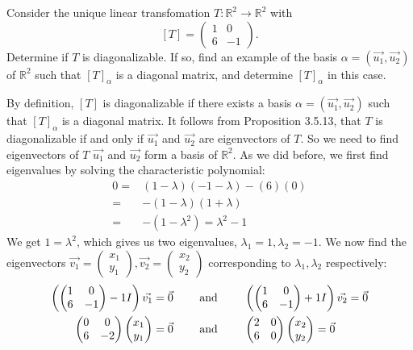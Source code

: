 \documentclass[12pt]{article}
\newenvironment{problem}[2][Problem]
{
	\begin{trivlist} 
		\item[\hskip \labelsep {\bfseries #1 #2:}]
	}
{
	\end{trivlist}
	}
\newenvironment{solution}[1][Solution]
{
	\begin{trivlist} 
		\item[\hskip \labelsep {\itshape #1:}]
	}
	{
	\end{trivlist}
}
\begin{document}
\newpage
\begin{problem}{5}
Consider the unique linear transfomation $T: \mathbb{R}^2 \to \mathbb{R}^2$ with
\[
[T] = \begin{pmatrix} 1&0\\6&-1\end{pmatrix} \text{.}
\]
Determine if $T$ is diagonalizable. If so, find an example of the basis $\alpha = (\vec{u_{1}}, \vec{u_{2}})$ of $\mathbb{R}^2$ such that $[T]_{\alpha}$ is a diagonal matrix, and determine $[T]_{\alpha}$ in this case.
\noindent
\newline
\newline
\begin{solution}
By definition, $[T]$ is diagonalizable if there exists a basis $\alpha = (\vec{u_{1}},\vec{u_{2}})$ such that $[T]_{\alpha}$ is a diagonal matrix. It follows from Proposition 3.5.13, that $T$ is diagonalizable if and only if $\vec{u_{1}}$ and $\vec{u_{2}}$ are eigenvectors of $T$. So we need to find eigenvectors of $T$ $\vec{u_{1}}$ and $\vec{u_{2}}$ form a basis of $\mathbb{R}^2$. As we did before, we first find eigenvalues by solving the characteristic polynomial:
\begin{align*}
0=&(1-\lambda)(-1-\lambda)-(6)(0)\\
=&-(1-\lambda)(1+\lambda)\\
=&-(1-\lambda ^2) = \lambda ^2 -1
\end{align*}
We get $1=\lambda ^2$, which gives us two eigenvalues, $\lambda_{1}=1,\lambda_{2}=-1$. We now find the eigenvectors $\vec{v_{1}}=\begin{pmatrix} x_{1}\\y_{1}\end{pmatrix},\vec{v_{2}} = \begin{pmatrix} x_{2}\\y_{2}\end{pmatrix}$ corresponding to $\lambda_{1},\lambda_{2}$ respectively:
\begin{align}
\left( \begin{pmatrix} 1&0\\6&-1\end{pmatrix} -1I \right)\vec{v_{1}}=\vec{0} \hphantom{1000} \text{ and }& \hphantom{1000} \left( \begin{pmatrix} 1&0\\6&-1\end{pmatrix} +1I \right)\vec{v_{2}}=\vec{0} \\
\begin{pmatrix} 0&0\\6&-2 \end{pmatrix}\begin{pmatrix} x_{1}\\y_{1} \end{pmatrix}=\vec{0} \hphantom{1000} \text{ and }& \hphantom{1000} \begin{pmatrix} 2&0\\6&0\end{pmatrix}\begin{pmatrix} x_{2}\\y_{2}\end{pmatrix}=\vec{0}\\

\end{align}
\end{solution}
\end{problem}
\end{document}
